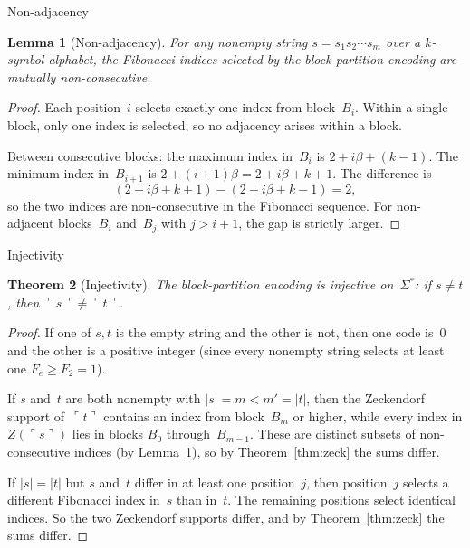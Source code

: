 \documentclass[11pt]{amsart}
\makeatletter
\renewcommand{\subsection}{\@startsection{subsection}{2}%
  \z@{.5\linespacing\@plus.7\linespacing}{-.5em}%
  {\normalfont\bfseries}}
\theoremstyle{plain}
\newtheorem{theorem}{Theorem}[section]
\newtheorem{lemma}[theorem]{Lemma}
\theoremstyle{definition}
\theoremstyle{remark}
\newcommand{\gc}[1]{\ulcorner #1 \urcorner}
\makeatother
\begin{document}
\subsection{Non-adjacency}

\begin{lemma}[Non-adjacency]\label{lem:nonadj}
For any nonempty string $s = s_1 s_2 \cdots s_m$ over a $k$-symbol alphabet, the Fibonacci indices selected by the block-partition encoding are mutually non-consecutive.
\end{lemma}

\begin{proof}
Each position~$i$ selects exactly one index from block~$B_i$. Within a single block, only one index is selected, so no adjacency arises within a block.

Between consecutive blocks: the maximum index in~$B_i$ is $2 + i\beta + (k-1)$. The minimum index in~$B_{i+1}$ is $2 + (i+1)\beta = 2 + i\beta + k + 1$. The difference is
\[
(2 + i\beta + k + 1) - (2 + i\beta + k - 1) = 2,
\]
so the two indices are non-consecutive in the Fibonacci sequence. For non-adjacent blocks~$B_i$ and~$B_j$ with $j > i+1$, the gap is strictly larger.
\end{proof}

\subsection{Injectivity}

\begin{theorem}[Injectivity]\label{thm:inj}
The block-partition encoding is injective on~$\Sigma^*$: if $s \ne t$, then $\gc{s} \ne \gc{t}$.
\end{theorem}

\begin{proof}
If one of $s,t$ is the empty string and the other is not, then one code is~$0$ and the other is a positive integer (since every nonempty string selects at least one $F_e \ge F_2 = 1$).

If $s$ and~$t$ are both nonempty with $|s| = m < m' = |t|$, then the Zeckendorf support of~$\gc{t}$ contains an index from block~$B_m$ or higher, while every index in $Z(\gc{s})$ lies in blocks $B_0$ through~$B_{m-1}$. These are distinct subsets of non-consecutive indices (by Lemma~\ref{lem:nonadj}), so by Theorem~\ref{thm:zeck} the sums differ.

If $|s|=|t|$ but $s$ and~$t$ differ in at least one position~$j$, then position~$j$ selects a different Fibonacci index in~$s$ than in~$t$. The remaining positions select identical indices. So the two Zeckendorf supports differ, and by Theorem~\ref{thm:zeck} the sums differ.
\end{proof}
\end{document}

